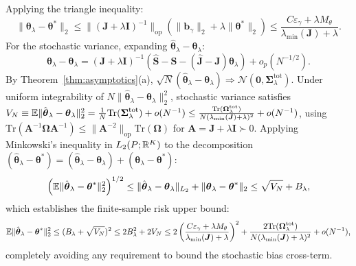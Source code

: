 Applying the triangle inequality:
\begin{equation}
    \|\boldsymbol{\theta}_\lambda - \boldsymbol{\theta}^*\|_2 \le \|(\boldsymbol{J} + \lambda \boldsymbol{I})^{-1}\|_{\mathrm{op}} \left( \|\boldsymbol{b}_\gamma\|_2 + \lambda \|\boldsymbol{\theta}^*\|_2 \right) \le \frac{C \varepsilon_\gamma + \lambda M_\theta}{\lambda_{\min}(\boldsymbol{J}) + \lambda}.
\end{equation}
For the stochastic variance, expanding $\hat{\boldsymbol{\theta}}_\lambda - \boldsymbol{\theta}_\lambda$:
\begin{equation}
    \hat{\boldsymbol{\theta}}_\lambda - \boldsymbol{\theta}_\lambda = (\boldsymbol{J} + \lambda \boldsymbol{I})^{-1} \left( \hat{\boldsymbol{S}} - \boldsymbol{S} - (\hat{\boldsymbol{J}} - \boldsymbol{J})\boldsymbol{\theta}_\lambda \right) + o_p(N^{-1/2}).
\end{equation}
By Theorem~\ref{thm:asymptotics}(a), $\sqrt{N}(\hat{\boldsymbol{\theta}}_\lambda - \boldsymbol{\theta}_\lambda) \Rightarrow \mathcal{N}(\mathbf{0}, \boldsymbol{\Sigma}_\lambda^{\mathrm{tot}})$. Under uniform integrability of $N\|\hat{\boldsymbol{\theta}}_\lambda - \boldsymbol{\theta}_\lambda\|_2^2$, stochastic variance satisfies $V_N \equiv \mathbb{E}\|\hat{\boldsymbol{\theta}}_\lambda - \boldsymbol{\theta}_\lambda\|_2^2 = \frac{1}{N}\mathrm{Tr}(\boldsymbol{\Sigma}_\lambda^{\mathrm{tot}}) + o(N^{-1}) \le \frac{\mathrm{Tr}(\boldsymbol{\Omega}_\lambda^{\mathrm{tot}})}{N (\lambda_{\min}(\boldsymbol{J}) + \lambda)^2} + o(N^{-1})$, using $\mathrm{Tr}(\boldsymbol{A}^{-1}\boldsymbol{\Omega}\boldsymbol{A}^{-1}) \le \|\boldsymbol{A}^{-2}\|_{\mathrm{op}}\mathrm{Tr}(\boldsymbol{\Omega})$ for $\boldsymbol{A} = \boldsymbol{J}+\lambda\boldsymbol{I} \succ 0$.
Applying Minkowski's inequality in $L_2(P; \mathbb{R}^K)$ to the decomposition $(\hat{\boldsymbol{\theta}}_\lambda - \boldsymbol{\theta}^*) = (\hat{\boldsymbol{\theta}}_\lambda - \boldsymbol{\theta}_\lambda) + (\boldsymbol{\theta}_\lambda - \boldsymbol{\theta}^*)$:
\begin{equation}
\label{eq:minkowski_risk}
    \left(\mathbb{E}\|\hat{\boldsymbol{\theta}}_\lambda - \boldsymbol{\theta}^*\|_2^2\right)^{1/2} \le \|\hat{\boldsymbol{\theta}}_\lambda - \boldsymbol{\theta}_\lambda\|_{L_2} + \|\boldsymbol{\theta}_\lambda - \boldsymbol{\theta}^*\|_2 \le \sqrt{V_N} + B_\lambda,
\end{equation}
which establishes the finite-sample risk upper bound:
\begin{equation}
    \mathbb{E}\|\hat{\boldsymbol{\theta}}_\lambda - \boldsymbol{\theta}^*\|_2^2 \le (B_\lambda + \sqrt{V_N})^2 \le 2 B_\lambda^2 + 2 V_N \le 2\left(\frac{C \varepsilon_\gamma + \lambda M_\theta}{\lambda_{\min}(\boldsymbol{J}) + \lambda}\right)^2 + \frac{2\mathrm{Tr}(\boldsymbol{\Omega}_\lambda^{\mathrm{tot}})}{N (\lambda_{\min}(\boldsymbol{J}) + \lambda)^2} + o(N^{-1}),
\end{equation}
completely avoiding any requirement to bound the stochastic bias cross-term.

